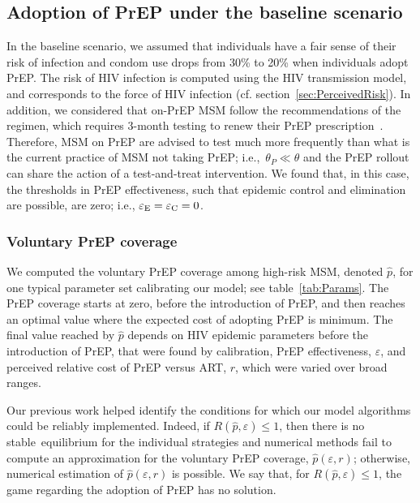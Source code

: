 \documentclass[12pt]{article}
\begin{document}
\subsection{Adoption of PrEP under the baseline scenario}

In the baseline scenario, we assumed that individuals have a fair sense of their risk of infection and condom use drops from 30\% to 20\% when individuals adopt PrEP.\cite{Molina2015} The risk of HIV infection is computed using the HIV transmission model, and corresponds to the force of HIV infection (cf. section~\ref{sec:PerceivedRisk}). 
In addition, we considered that on-PrEP MSM follow the recommendations of the regimen, which requires 3-month testing to renew their PrEP prescription~\cite{Molina2015}. Therefore, MSM on PrEP are advised to test much more frequently than what is the current practice of MSM not taking PrEP; i.e.,~$\theta_P \ll \theta$ and the PrEP rollout can share the action of a test-and-treat intervention. We found that, in this case, the thresholds in PrEP effectiveness, such that epidemic control and elimination are possible, are zero; i.e., $\varepsilon_{\rm E} = \varepsilon_{\rm C} = 0$.


\subsubsection{Voluntary PrEP coverage}

We computed the voluntary PrEP coverage among high-risk MSM, denoted $\hat{p}$, for one typical parameter set calibrating our model; see table~\ref{tab:Params}. The PrEP coverage starts at zero, before the introduction of PrEP, and then reaches an optimal value where the expected cost of adopting PrEP is minimum. The final value reached by $\hat{p}$ depends on HIV epidemic parameters before the introduction of PrEP, that were found by calibration, PrEP effectiveness, $\varepsilon$, and perceived relative cost of PrEP versus ART, $r$, which were varied over broad ranges. 

Our previous work \cite{Jijon2017} helped identify the conditions for which our model algorithms could be reliably implemented. Indeed, if $R(\hat{p},\varepsilon) \leq 1$, then there is no stable~equilibrium for the individual strategies and numerical methods fail to compute an approximation for the voluntary PrEP coverage, $\hat{p}(\varepsilon, r)$; otherwise, numerical estimation of $\hat{p}(\varepsilon, r)$ is possible. We say that, for $R(\hat{p},\varepsilon) \leq 1$, the game regarding the adoption of PrEP has no solution.
\end{document}

